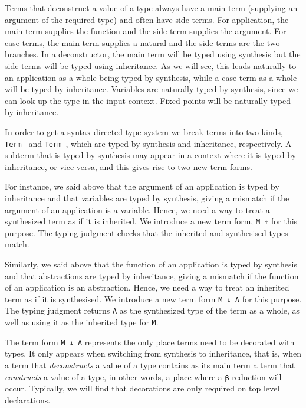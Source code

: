 Terms that deconstruct a value of a type always have a main term
(supplying an argument of the required type) and often have side-terms.
For application, the main term supplies the function and the side term
supplies the argument. For case terms, the main term supplies a natural
and the side terms are the two branches. In a deconstructor, the main
term will be typed using synthesis but the side terms will be typed
using inheritance. As we will see, this leads naturally to an
application as a whole being typed by synthesis, while a case term as a
whole will be typed by inheritance. Variables are naturally typed by
synthesis, since we can look up the type in the input context. Fixed
points will be naturally typed by inheritance.

In order to get a syntax-directed type system we break terms into two
kinds, \texttt{Term⁺} and \texttt{Term⁻}, which are typed by synthesis
and inheritance, respectively. A subterm that is typed by synthesis may
appear in a context where it is typed by inheritance, or vice-versa, and
this gives rise to two new term forms.

For instance, we said above that the argument of an application is typed
by inheritance and that variables are typed by synthesis, giving a
mismatch if the argument of an application is a variable. Hence, we need
a way to treat a synthesized term as if it is inherited. We introduce a
new term form, \texttt{M\ ↑} for this purpose. The typing judgment
checks that the inherited and synthesised types match.

Similarly, we said above that the function of an application is typed by
synthesis and that abstractions are typed by inheritance, giving a
mismatch if the function of an application is an abstraction. Hence, we
need a way to treat an inherited term as if it is synthesised. We
introduce a new term form \texttt{M\ ↓\ A} for this purpose. The typing
judgment returns \texttt{A} as the synthesized type of the term as a
whole, as well as using it as the inherited type for \texttt{M}.

The term form \texttt{M\ ↓\ A} represents the only place terms need to
be decorated with types. It only appears when switching from synthesis
to inheritance, that is, when a term that \emph{deconstructs} a value of
a type contains as its main term a term that \emph{constructs} a value
of a type, in other words, a place where a \texttt{β}-reduction will
occur. Typically, we will find that decorations are only required on top
level declarations.

